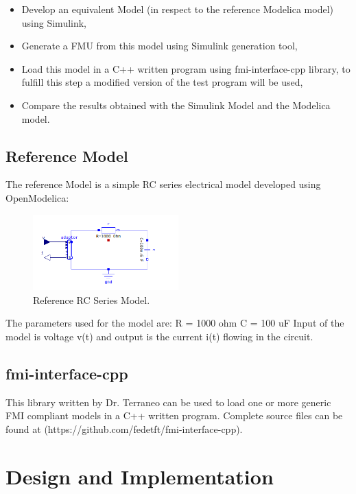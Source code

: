 \begin{itemize}
\item Develop an equivalent Model (in respect to the reference Modelica model) using Simulink,
\item Generate a FMU from this model using Simulink generation tool,
\item Load this model in a C++ written program using fmi-interface-cpp library, to fulfill this step a modified version of the test program will be used,
\item Compare the results obtained with the Simulink Model and the Modelica model.
\end{itemize}

\subsection{Reference Model}

The reference Model is a simple RC series electrical model developed using OpenModelica:
\begin{figure}[h]
\centering
\includegraphics[width=0.5\textwidth]{OmRcModel.png}
\caption{\label{fig:ModelicaModel}Reference RC Series Model.}
\end{figure}
\newline
The parameters used for the model are:
\newline
R = 1000 ohm
\newline
C = 100  uF
\newline
Input of the model is voltage v(t) and output is the current i(t) flowing in the circuit.

\subsection{fmi-interface-cpp}
This library written by Dr. Terraneo can be used to load one or more generic FMI compliant models in a C++ written program. 
Complete source files can be found at (https://github.com/fedetft/fmi-interface-cpp).


\section{Design and Implementation}

